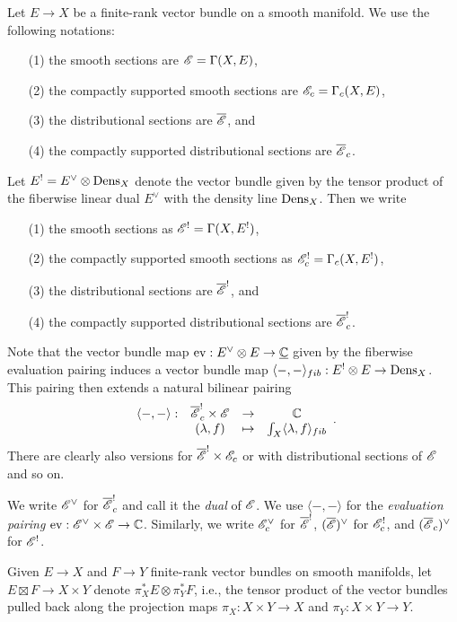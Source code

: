 Let $E \to X$ be a finite-rank vector bundle on a smooth manifold.
We use the following notations:
\begin{enumerate}
\item[(1)] the smooth sections are $\mathscr E = \Gamma(X,E)$,
\item[(2)] the compactly supported smooth sections are $\mathscr E_c = \Gamma_c(X,E)$,
\item[(3)] the distributional sections are $\overline{\mathscr E}$, and
\item[(4)] the compactly supported distributional sections are $\overline{\mathscr E}_c$.
\end{enumerate}
Let $E^! = E^\vee \otimes {\rm Dens}_X$ denote the vector bundle given by 
the tensor product of the fiberwise linear dual $E^\vee$ with the density line ${\rm Dens}_X$.
Then we write
\begin{enumerate}
\item[(1)] the smooth sections as $\mathscr E^! = \Gamma(X,E^!)$,
\item[(2)] the compactly supported smooth sections as $\mathscr E_c^! = \Gamma_c(X,E^!)$,
\item[(3)] the distributional sections are $\overline{\mathscr E}^!$, and
\item[(4)] the compactly supported distributional sections are $\overline{\mathscr E}_c^!$.
\end{enumerate}
Note that the vector bundle map ${\rm ev}: E^\vee \otimes E \to \underline{\mathbb C}$ given by the fiberwise evaluation pairing 
induces a vector bundle map $\langle-,-\rangle_{fib}: E^! \otimes E \to {\rm Dens}_X$.
This pairing then extends a natural bilinear pairing 
\[
\begin{array}{cccc}
\langle-,-\rangle: &\overline{\mathscr E}^!_c \times \mathscr E & \to & \mathbb C \\
& (\lambda,f) & \mapsto & \int_X \langle \lambda, f\rangle_{fib}
\end{array}.
\]
There are clearly also versions for $\overline{\mathscr E}^! \times \mathscr E_c$ or with distributional sections of $\mathscr E$ and so on.

\begin{dfn}
We write $\mathscr E^\vee$ for $\overline{\mathscr E}^!_c$ and call it the {\em dual} of $\mathscr E$. 
We use $\langle-,-\rangle$ for the {\em evaluation pairing} ${\rm ev}: \mathscr E^\vee \times \mathscr E \to \mathbb C$.
Similarly, we write $\mathscr E_c^\vee$ for $\overline{\mathscr E}^!$, $(\overline{\mathscr E})^\vee$  for $\mathscr E^!_c$, and $(\overline{\mathscr E}_c)^\vee$  for $\mathscr E^!$.
\end{dfn}

Given $E \to X$ and $F \to Y$ finite-rank vector bundles on smooth manifolds,
let $E \boxtimes F \to X \times Y$ denote $\pi_X^*E \otimes \pi_Y^* F$,
i.e., the tensor product of the vector bundles pulled back along the projection maps 
$\pi_X: X \times Y \to X$ and $\pi_Y: X \times Y \to Y$.

